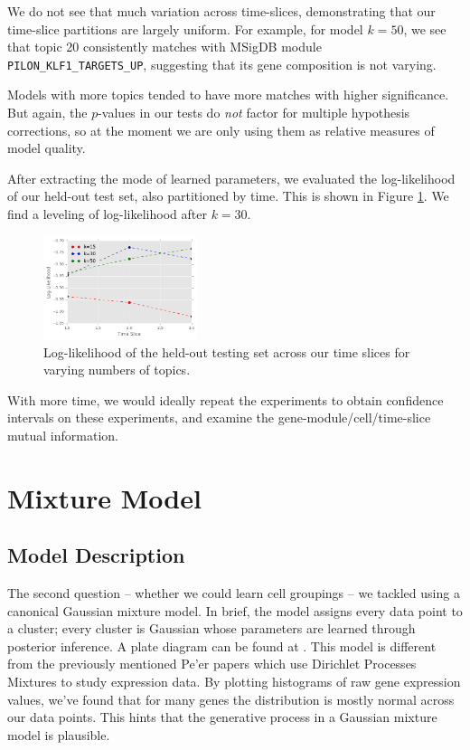 \documentclass{article}
\begin{document}
We do not see that much variation across time-slices, demonstrating that our time-slice partitions are largely uniform. For example, for model $k=50$, we see that topic 20 consistently matches with MSigDB module \texttt{PILON\_KLF1\_TARGETS\_UP}, suggesting that its gene composition is not varying.

Models with more topics tended to have more matches with higher significance. But again, the $p$-values in our tests do \textit{not} factor for multiple hypothesis corrections, so at the moment we are only using them as relative measures of model quality.

After extracting the mode of learned parameters, we evaluated the log-likelihood of our held-out test set, also partitioned by time. This is shown in Figure \ref{fig:lldtm}. We find a leveling of log-likelihood after $k=30$.

\begin{figure}
    \centering
    \includegraphics[width=0.4\textwidth]{figs/lldtm}
    \caption{Log-likelihood of the held-out testing set across our time slices for varying numbers of topics.}
    \label{fig:lldtm}
\vskip -0.2in
\end{figure}

With more time, we would ideally repeat the experiments to obtain confidence intervals on these experiments, and examine the gene-module/cell/time-slice mutual information.

\section{Mixture Model} 
\label{mmsec}
\subsection{Model Description} 
The second question -- whether we could learn cell groupings -- we tackled using a canonical Gaussian mixture model. In brief, the model assigns every data point to a cluster; every cluster is Gaussian whose parameters are learned through posterior inference. A plate diagram can be found at \cite{mmplate}. This model is different from the previously mentioned Pe'er papers which use Dirichlet Processes Mixtures to study expression data. By plotting 
histograms of raw gene expression values, we've found that for many genes the distribution is mostly normal across our data points. This hints that the generative process in a Gaussian mixture model is plausible.
\end{document}
